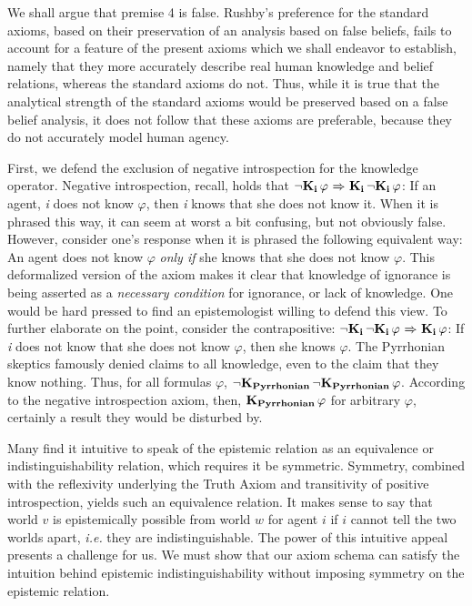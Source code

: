 We shall argue that premise 4 is false. Rushby's preference for the standard axioms, based on their preservation of an analysis based on false beliefs, fails to account for a feature of the present axioms which we shall endeavor to establish, namely that they more accurately describe real human knowledge and belief relations, whereas the standard axioms do not. Thus, while it is true that the analytical strength of the standard axioms would be preserved based on a false belief analysis, it does not follow that these axioms are preferable, because they do not accurately model human agency.

First, we defend the exclusion of negative introspection for the knowledge operator. Negative introspection, recall, holds that ${\neg}\mathbf{K}_{\mathbf{i}}\,\varphi{\ \Rightarrow \ }\mathbf{K}_{\mathbf{i}}\,{\neg}\mathbf{K}_{\mathbf{i}}\,\varphi$: If an agent, \emph{i} does not know $\varphi$, then \emph{i} knows that she does not know it. When it is phrased this way, it can seem at worst a bit confusing, but not obviously false. However, consider one's response when it is phrased the following equivalent way: An agent does not know $\varphi$ \emph{only if} she knows that she does not know $\varphi$. This deformalized version of the axiom makes it clear that knowledge of ignorance is being asserted as a \emph{necessary condition} for ignorance, or lack of knowledge. One would be hard pressed to find an epistemologist willing to defend this view. To further elaborate on the point, consider the contrapositive: ${\neg}\mathbf{K}_{\mathbf{i}}\,{\neg}\mathbf{K}_{\mathbf{i}}\,\varphi {\ \Rightarrow \ } \mathbf{K}_{\mathbf{i}}\,\varphi$: If \emph{i} does not know that she does not know $\varphi$, then she knows $\varphi$. The Pyrrhonian skeptics famously denied claims to all knowledge, even to the claim that they know nothing. Thus, for all formulas $\varphi$, ${\neg}\mathbf{K}_{\mathbf{Pyrrhonian}}\,{\neg}\mathbf{K}_{\mathbf{Pyrrhonian}}\,\varphi$. According to the negative introspection axiom, then, $\mathbf{K}_{\mathbf{Pyrrhonian}}\,\varphi$ for arbitrary $\varphi$, certainly a result they would be disturbed by.

Many find it intuitive to speak of the epistemic relation as an equivalence or indistinguishability relation, which requires it be symmetric. Symmetry, combined with the reflexivity underlying the Truth Axiom and transitivity of positive introspection, yields such an equivalence relation. It makes sense to say that world $v$ is epistemically possible from world $w$ for agent $i$ if $i$ cannot tell the two worlds apart, \emph{i.e.} they are indistinguishable. The power of this intuitive appeal presents a challenge for us. We must show that our axiom schema can satisfy the intuition behind epistemic indistinguishability without imposing symmetry on the epistemic relation.

